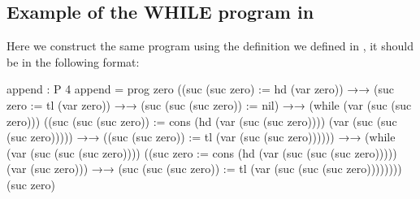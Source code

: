\subsection{Example of the WHILE program in \Agda}
Here we construct the same program using the definition we defined in \Agda, it should be in the following format:
\begin{code}[fontsize=\footnotesize]
append : P 4
append = prog zero
             ((suc (suc zero) := hd (var zero)) 
	     →→
             (suc zero := tl (var zero)) 
	     →→
             (suc (suc (suc zero)) := nil) 
	     →→
             (while
               (var (suc (suc zero)))
               ((suc (suc (suc zero)) := 
			cons (hd (var (suc (suc zero)))) 
			     (var (suc (suc (suc zero))))) 
	       →→
               ((suc (suc zero)) := tl (var (suc (suc zero)))))) 
	       →→
             (while
               (var (suc (suc (suc zero))))
               ((suc zero := cons (hd (var (suc (suc (suc zero))))) 
				  (var (suc zero))) 
	     →→
               (suc (suc (suc zero)) := tl (var (suc (suc (suc zero))))))))
             (suc zero)
\end{code}
